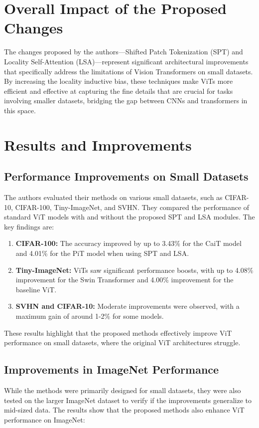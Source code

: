 \documentclass{report}
\begin{document}
	
	\section{Overall Impact of the Proposed Changes}
	The changes proposed by the authors—Shifted Patch Tokenization (SPT) and Locality Self-Attention (LSA)—represent significant architectural improvements that specifically address the limitations of Vision Transformers on small datasets. By increasing the locality inductive bias, these techniques make ViTs more efficient and effective at capturing the fine details that are crucial for tasks involving smaller datasets, bridging the gap between CNNs and transformers in this space.
	
	
	
	
	
	\section{Results and Improvements}
	\subsection{Performance Improvements on Small Datasets}
	The authors evaluated their methods on various small datasets, such as CIFAR-10, CIFAR-100, Tiny-ImageNet, and SVHN. They compared the performance of standard ViT models with and without the proposed SPT and LSA modules. The key findings are:
	
	\begin{enumerate}
		\item 
		\textbf{CIFAR-100:} The accuracy improved by up to 3.43\% for the CaiT model and 4.01\% for the PiT model when using SPT and LSA.
		
		\item 
		\textbf{Tiny-ImageNet:} ViTs saw significant performance boosts, with up to 4.08\% improvement for the Swin Transformer and 4.00\% improvement for the baseline ViT.
		
		\item 
		\textbf{SVHN and CIFAR-10:} Moderate improvements were observed, with a maximum gain of around 1-2\% for some models.
	\end{enumerate}
	These results highlight that the proposed methods effectively improve ViT performance on small datasets, where the original ViT architectures struggle.
	
	\subsection{Improvements in ImageNet Performance}
	While the methods were primarily designed for small datasets, they were also tested on the larger ImageNet dataset to verify if the improvements generalize to mid-sized data. The results show that the proposed methods also enhance ViT performance on ImageNet:
	
\end{document}
